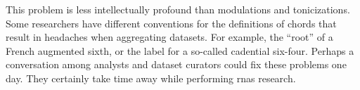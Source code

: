 
This problem is less intellectually profound than
modulations and tonicizations. Some researchers have
different conventions for the definitions of chords that
result in headaches when aggregating datasets. For example,
the ``root'' of a French augmented sixth, or the label for a
so-called cadential six-four. Perhaps a conversation among
analysts and dataset curators could fix these problems one
day. They certainly take time away while performing
\glspl{rna} research.

